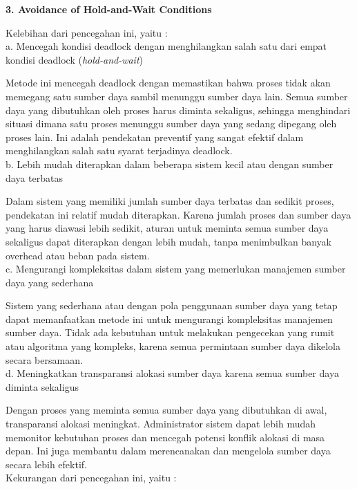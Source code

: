 \documentclass[12pt]{article}
\begin{document}
\textbf{3. Avoidance of Hold-and-Wait Conditions\\}

    Kelebihan dari pencegahan ini, yaitu :\\

    a. Mencegah kondisi deadlock dengan menghilangkan salah satu dari empat kondisi deadlock (\textit{hold-and-wait})
    
    Metode ini mencegah deadlock dengan memastikan bahwa proses tidak akan memegang satu sumber daya sambil menunggu sumber daya lain. Semua sumber daya yang dibutuhkan oleh proses harus diminta sekaligus, sehingga menghindari situasi dimana satu proses menunggu sumber daya yang sedang dipegang oleh proses lain. Ini adalah pendekatan preventif yang sangat efektif dalam menghilangkan salah satu syarat terjadinya deadlock.\\

    b. Lebih mudah diterapkan dalam beberapa sistem kecil atau dengan sumber daya terbatas
    
    Dalam sistem yang memiliki jumlah sumber daya terbatas dan sedikit proses, pendekatan ini relatif mudah diterapkan. Karena jumlah proses dan sumber daya yang harus diawasi lebih sedikit, aturan untuk meminta semua sumber daya sekaligus dapat diterapkan dengan lebih mudah, tanpa menimbulkan banyak overhead atau beban pada sistem.\\

    c. Mengurangi kompleksitas dalam sistem yang memerlukan manajemen sumber daya yang sederhana
    
    Sistem yang sederhana atau dengan pola penggunaan sumber daya yang tetap dapat memanfaatkan metode ini untuk mengurangi kompleksitas manajemen sumber daya. Tidak ada kebutuhan untuk melakukan pengecekan yang rumit atau algoritma yang kompleks, karena semua permintaan sumber daya dikelola secara bersamaan.\\

    d. Meningkatkan transparansi alokasi sumber daya karena semua sumber daya diminta sekaligus
    
    Dengan proses yang meminta semua sumber daya yang dibutuhkan di awal, transparansi alokasi meningkat. Administrator sistem dapat lebih mudah memonitor kebutuhan proses dan mencegah potensi konflik alokasi di masa depan. Ini juga membantu dalam merencanakan dan mengelola sumber daya secara lebih efektif.\\

    Kekurangan dari pencegahan ini, yaitu :\\
\end{document}
